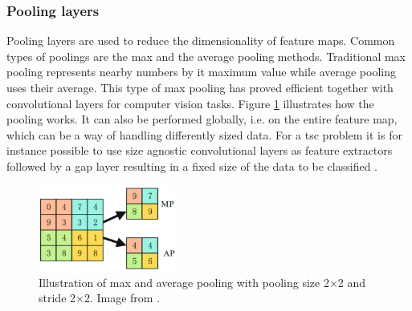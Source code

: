 
\subsubsection{Pooling layers}
Pooling layers are used to reduce the dimensionality of feature maps. Common types of poolings are the max and the average pooling methods. Traditional max pooling represents nearby numbers by it maximum value while average pooling uses their average. This type of max pooling has proved efficient together with convolutional layers for computer vision tasks. Figure \ref{fig:pooling} illustrates how the pooling works. It can also be performed globally, i.e. on the entire feature map, which can be a way of handling differently sized data. For a \gls{tsc} problem it is for instance possible to use size agnostic convolutional layers as feature extractors followed by a \gls{gap} layer resulting in a fixed size of the data to be classified \cite{Chollet2018}.

\begin{figure}
  \centering
  \includegraphics[width=0.4\textwidth]{files/figs/pooling.png}
  \caption{Illustration of max and average pooling with pooling size 2$\times$2 and stride 2$\times$2. Image from \cite{Wang2018}.}
  \label{fig:pooling}
\end{figure}


